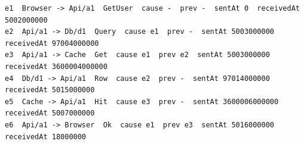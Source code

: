 \begin{lstlisting}[language={},basicstyle=\ttfamily\scriptsize,breaklines=true]
e1  Browser -> Api/a1  GetUser  cause -  prev -  sentAt 0  receivedAt 5002000000
e2  Api/a1 -> Db/d1  Query  cause e1  prev -  sentAt 5003000000  receivedAt 97004000000
e3  Api/a1 -> Cache  Get  cause e1  prev e2  sentAt 5003000000  receivedAt 3600004000000
e4  Db/d1 -> Api/a1  Row  cause e2  prev -  sentAt 97014000000  receivedAt 5015000000
e5  Cache -> Api/a1  Hit  cause e3  prev -  sentAt 3600006000000  receivedAt 5007000000
e6  Api/a1 -> Browser  Ok  cause e1  prev e3  sentAt 5016000000  receivedAt 18000000
\end{lstlisting}
